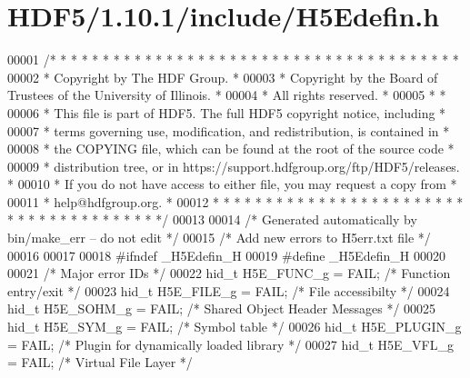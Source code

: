 \hypertarget{_h_d_f5_21_810_81_2include_2_h5_edefin_8h_source}{}\section{H\+D\+F5/1.10.1/include/\+H5\+Edefin.h}
\label{_h_d_f5_21_810_81_2include_2_h5_edefin_8h_source}

\begin{DoxyCode}
00001 \textcolor{comment}{/* * * * * * * * * * * * * * * * * * * * * * * * * * * * * * * * * * * * * * *}
00002 \textcolor{comment}{ * Copyright by The HDF Group.                                               *}
00003 \textcolor{comment}{ * Copyright by the Board of Trustees of the University of Illinois.         *}
00004 \textcolor{comment}{ * All rights reserved.                                                      *}
00005 \textcolor{comment}{ *                                                                           *}
00006 \textcolor{comment}{ * This file is part of HDF5.  The full HDF5 copyright notice, including     *}
00007 \textcolor{comment}{ * terms governing use, modification, and redistribution, is contained in    *}
00008 \textcolor{comment}{ * the COPYING file, which can be found at the root of the source code       *}
00009 \textcolor{comment}{ * distribution tree, or in https://support.hdfgroup.org/ftp/HDF5/releases.  *}
00010 \textcolor{comment}{ * If you do not have access to either file, you may request a copy from     *}
00011 \textcolor{comment}{ * help@hdfgroup.org.                                                        *}
00012 \textcolor{comment}{ * * * * * * * * * * * * * * * * * * * * * * * * * * * * * * * * * * * * * * */}
00013 
00014 \textcolor{comment}{/* Generated automatically by bin/make\_err -- do not edit */}
00015 \textcolor{comment}{/* Add new errors to H5err.txt file */}
00016 
00017 
00018 \textcolor{preprocessor}{#ifndef \_H5Edefin\_H}
00019 \textcolor{preprocessor}{#define \_H5Edefin\_H}
00020 
00021 \textcolor{comment}{/* Major error IDs */}
00022 hid\_t H5E\_FUNC\_g           = FAIL;      \textcolor{comment}{/* Function entry/exit */}
00023 hid\_t H5E\_FILE\_g           = FAIL;      \textcolor{comment}{/* File accessibilty */}
00024 hid\_t H5E\_SOHM\_g           = FAIL;      \textcolor{comment}{/* Shared Object Header Messages */}
00025 hid\_t H5E\_SYM\_g            = FAIL;      \textcolor{comment}{/* Symbol table */}
00026 hid\_t H5E\_PLUGIN\_g         = FAIL;      \textcolor{comment}{/* Plugin for dynamically loaded library */}
00027 hid\_t H5E\_VFL\_g            = FAIL;      \textcolor{comment}{/* Virtual File Layer */}

\end{DoxyCode}
